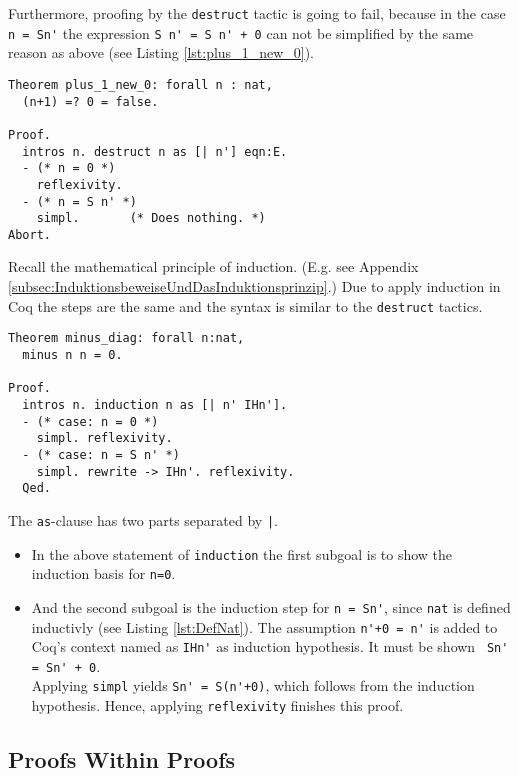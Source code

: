Furthermore, proofing by the \lstinline!destruct! tactic is going to fail, because in the case \lstinline!n = Sn'! the expression \lstinline!S n' = S n' + 0! can not be simplified by the same reason as above (see Listing \ref{lst:plus_1_new_0}).
\begin{lstlisting}[caption = \lstinline!plus_1_new_0!, label = lst:plus_1_new_0]
Theorem plus_1_new_0: forall n : nat,
  (n+1) =? 0 = false. 
 
Proof.
  intros n. destruct n as [| n'] eqn:E.
  - (* n = 0 *)
    reflexivity. 
  - (* n = S n' *)
    simpl.       (* Does nothing. *)
Abort.
\end{lstlisting}

Recall the mathematical principle of induction. (E.g. see Appendix \ref{subsec:InduktionsbeweiseUndDasInduktionsprinzip}.)
Due to apply induction in Coq the steps are the same and the syntax is similar to the \lstinline!destruct! tactics.
 

\begin{lstlisting}[caption = \lstinline!minus_diag!, label =lst:minus_diag] 
Theorem minus_diag: forall n:nat,
  minus n n = 0.
  
Proof.
  intros n. induction n as [| n' IHn'].
  - (* case: n = 0 *)
    simpl. reflexivity.
  - (* case: n = S n' *)
    simpl. rewrite -> IHn'. reflexivity.  
  Qed.
\end{lstlisting}

The \lstinline!as!-clause has two parts separated by \lstinline!|!.
\begin{itemize}
	\item In the above statement of \lstinline!induction! the first subgoal is to show the induction basis for \lstinline!n=0!.
	\item And the second subgoal is the induction step for \lstinline!n = Sn'!, since \lstinline!nat! is defined inductivly (see Listing  \ref{lst:DefNat}).
	      The assumption \lstinline!n'+0 = n'! is added to Coq's context named as \lstinline!IHn'! as induction hypothesis.
		  It must be shown \lstinline! Sn' = Sn' + 0!. \\
          Applying \lstinline!simpl! yields \lstinline!Sn' = S(n'+0)!, which follows from the induction hypothesis. 
          Hence, applying \lstinline!reflexivity! finishes this proof.
\end{itemize} 

\subsection{Proofs Within Proofs}
\label{subsection:ProofsWithinProofs}

